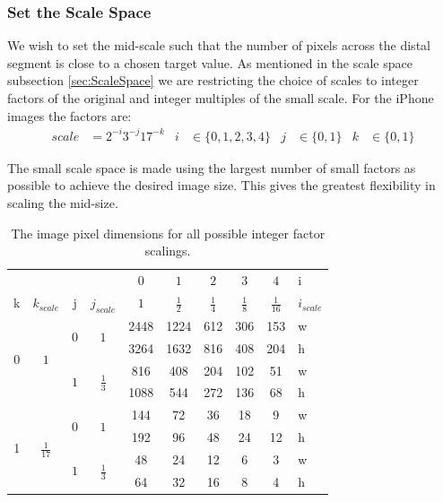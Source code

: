 \subsubsection{Set the Scale Space}\label{sec:SetTheScaleSpace}
We wish to set the mid-scale such that the number of pixels across the distal segment is close to a chosen target value. As mentioned in the scale space subsection \ref{sec:ScaleSpace} we are restricting the choice of scales to integer factors of the original and integer multiples of the small scale. For the iPhone images the factors are:
\begin{align}
scale &= 2^{-i} 3^{-j} 17^{-k}  & i &\in \{0,1,2,3,4\} 
&  j &\in \{0, 1\} 
& k &\in \{0, 1\}
\end{align}

The small scale space is made using the largest number of small factors as possible to achieve the desired image size. This gives the greatest flexibility in scaling the mid-size.
\begin{table}[h]
\centering
\begin{tabular}{|cc|cc|c|c|c|c|c|l|}
\cline{5-10}
\multicolumn{3}{c}{ }  & & $0$ & $1$ & $2$ & $3$ & $4$ & i\\
\cline{1-10}
k & $k_{scale}$ &j & $j_{scale}$ & $1$ & $\frac{1}{2}$ & $\frac{1}{4}$ & $\frac{1}{8}$ & $\frac{1}{16}$ & $i_{scale}$\\
  \hline \hline
\multirow{4}{*}{$0$} & \multirow{4}{*}{$1$} & \multirow{2}{*}{$0$} & \multirow{2}{*}{$1$} & 
 2448 & 1224  &  612  & 306  & 153 & w \\
  &  &  & & 
  3264  & 1632  & 816  & 408  & 204  & h\\
  \cline{3-10}
 &  & \multirow{2}{*}{$1$} & \multirow{2}{*}{$\frac{1}{3}$} & 
 816  & 408  & 204  & 102  & 51  & w \\
 &  &  & & 
  1088  & 544   & 272  & 136  & 68  & h \\
\hline 
  \hline
\multirow{4}{*}{1} & \multirow{4}{*}{ $\frac{1}{17}$ } & \multirow{2}{*}{$0$} & \multirow{2}{*}{$1$} & 
 144  & 72  & 36  & 18  & 9 & w \\
 &  & & & 
  192  & 96  & 48  & 24  & 12  & h \\
    \cline{3-10}
 &  &  \multirow{2}{*}{$1$} & \multirow{2}{*}{$\frac{1}{3}$} & 
 48  & 24   & 12  & 6   & 3 & w \\
   &  &   & & 
  64  & 32  & 16  & 8  & 4  & h \\
\hline 
\end{tabular}
\caption{The image pixel dimensions for all possible integer factor scalings.}
\end{table}

